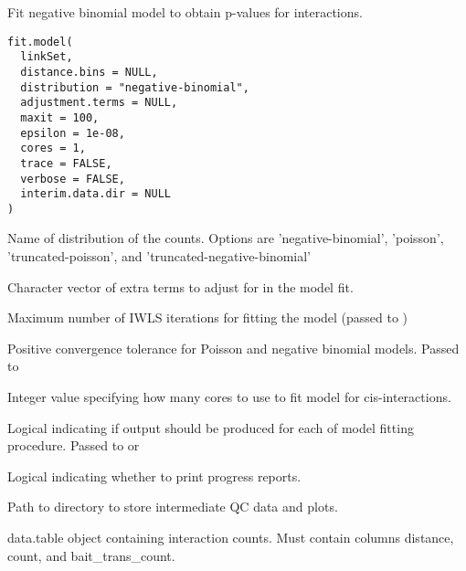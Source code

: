 \documentclass[letterpaper]{book}
\begin{document}
%
\begin{Description}
Fit negative binomial model to obtain p-values for interactions.
\end{Description}
%
\begin{Usage}
\begin{verbatim}
fit.model(
  linkSet,
  distance.bins = NULL,
  distribution = "negative-binomial",
  adjustment.terms = NULL,
  maxit = 100,
  epsilon = 1e-08,
  cores = 1,
  trace = FALSE,
  verbose = FALSE,
  interim.data.dir = NULL
)
\end{verbatim}
\end{Usage}
%
\begin{Arguments}
\begin{ldescription}
\item[\code{distribution}] Name of distribution of the counts. Options are 'negative-binomial',
'poisson', 'truncated-poisson', and 'truncated-negative-binomial'

\item[\code{adjustment.terms}] Character vector of extra terms to adjust for in the model fit.

\item[\code{maxit}] Maximum number of IWLS iterations for fitting the model (passed to )

\item[\code{epsilon}] Positive convergence tolerance for Poisson and negative binomial models. Passed to 

\item[\code{cores}] Integer value specifying how many cores to use to fit model for cis-interactions.

\item[\code{trace}] Logical indicating if output should be produced for each of model fitting procedure. Passed to  or 

\item[\code{verbose}] Logical indicating whether to print progress reports.

\item[\code{interim.data.dir}] Path to directory to store intermediate QC data and plots.

\item[\code{interaction.data}] data.table object containing interaction counts. Must contain columns distance, count, and bait\_trans\_count.
\end{ldescription}
\end{Arguments}
\end{document}
